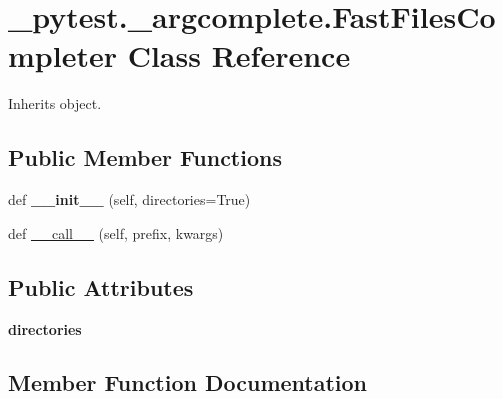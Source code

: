 \hypertarget{class__pytest_1_1__argcomplete_1_1_fast_files_completer}{}\section{\+\_\+pytest.\+\_\+argcomplete.\+Fast\+Files\+Completer Class Reference}
\label{class__pytest_1_1__argcomplete_1_1_fast_files_completer}


Inherits object.

\subsection*{Public Member Functions}
\begin{DoxyCompactItemize}
\item 
\mbox{\label{class__pytest_1_1__argcomplete_1_1_fast_files_completer_aebda3280347f5ee0da634e69f9a6c0a4}} 
def {\bfseries \+\_\+\+\_\+init\+\_\+\+\_\+} (self, directories=True)
\item 
def \hyperlink{class__pytest_1_1__argcomplete_1_1_fast_files_completer_a208844ef3c83d3ea3ea0753058db0b69}{\+\_\+\+\_\+call\+\_\+\+\_\+} (self, prefix, kwargs)
\end{DoxyCompactItemize}
\subsection*{Public Attributes}
\begin{DoxyCompactItemize}
\item 
\mbox{\label{class__pytest_1_1__argcomplete_1_1_fast_files_completer_af4e0266f63681596d7d8eb46f7a0c75c}} 
{\bfseries directories}
\end{DoxyCompactItemize}


\subsection{Member Function Documentation}
\mbox{\label{class__pytest_1_1__argcomplete_1_1_fast_files_completer_a208844ef3c83d3ea3ea0753058db0b69}} 
